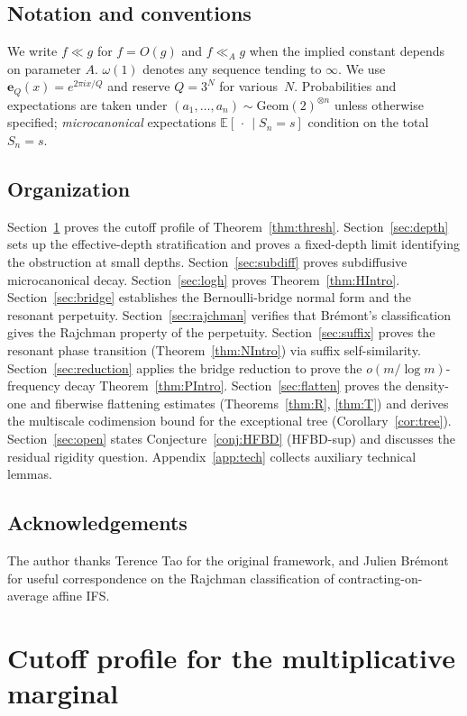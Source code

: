 \documentclass[11pt,a4paper]{amsart}
\theoremstyle{plain}
\theoremstyle{definition}
\newcommand{\E}{\mathbb{E}}
\newcommand{\Geom}{\mathrm{Geom}}
\begin{document}
\subsection{Notation and conventions}
We write $f\ll g$ for $f=O(g)$ and $f\ll_A g$ when the implied constant
depends on parameter $A$.
$\omega(1)$ denotes any sequence tending to $\infty$.
We use $\mathbf e_Q(x)=e^{2\pi ix/Q}$ and reserve $Q=3^N$ for various~$N$.
Probabilities and expectations are taken under
$(a_1,\dots,a_n)\sim\Geom(2)^{\otimes n}$ unless otherwise specified;
\emph{microcanonical} expectations $\E[\,\cdot\,\mid S_n=s]$
condition on the total $S_n=s$.

\subsection{Organization}
Section~\ref{sec:profile} proves the cutoff profile of
Theorem~\ref{thm:thresh}.
Section~\ref{sec:depth} sets up the effective-depth stratification and
proves a fixed-depth limit identifying the obstruction at small depths.
Section~\ref{sec:subdiff} proves subdiffusive microcanonical decay.
Section~\ref{sec:logh} proves Theorem~\ref{thm:HIntro}.
Section~\ref{sec:bridge} establishes the Bernoulli-bridge normal form and
the resonant perpetuity.
Section~\ref{sec:rajchman} verifies that Br\'emont's classification gives
the Rajchman property of the perpetuity.
Section~\ref{sec:suffix} proves the resonant phase transition
(Theorem~\ref{thm:NIntro}) via suffix self-similarity.
Section~\ref{sec:reduction} applies the bridge reduction to prove the
$o(m/\log m)$-frequency decay
Theorem~\ref{thm:PIntro}.
Section~\ref{sec:flatten} proves the density-one and fiberwise flattening
estimates (Theorems~\ref{thm:R}, \ref{thm:T}) and derives the
multiscale codimension bound for the exceptional tree
(Corollary~\ref{cor:tree}).
Section~\ref{sec:open} states Conjecture~\ref{conj:HFBD} (HFBD-sup) and
discusses the residual rigidity question.
Appendix~\ref{app:tech} collects auxiliary technical lemmas.

\subsection*{Acknowledgements}
The author thanks Terence Tao for the original framework, and
Julien Br\'emont for useful correspondence on the Rajchman classification
of contracting-on-average affine IFS.

\section{Cutoff profile for the multiplicative marginal}\label{sec:profile}
\end{document}
